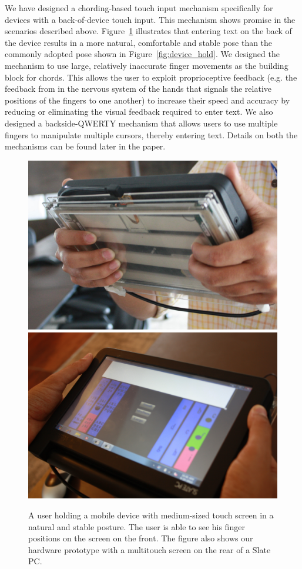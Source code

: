We have designed a chording-based touch input mechanism specifically for devices with a back-of-device touch input.  This mechanism shows promise in the scenarios described above.  Figure~\ref{fig:natural} illustrates that entering text on the back of the device results in a more natural, comfortable and stable pose than the commonly adopted pose shown in Figure~\ref{fig:device_hold}.  We designed the mechanism to use large, relatively inaccurate finger movements as the building
block for chords.  This allows the user to exploit proprioceptive feedback (e.g. the feedback from in the nervous system of the hands that signals the relative positions of the fingers to one another) to
increase their speed and accuracy by reducing or eliminating the visual feedback required to enter text. We also designed a backside-QWERTY mechanism that allows users to use multiple fingers to manipulate multiple cursors, thereby entering text. Details on both the mechanisms can be found later in the paper.

\begin{figure}
    \includegraphics[scale=0.43]{Figures/natural1.pdf} 
     \includegraphics[scale=0.43]{Figures/natural2.pdf} 
     \caption{A user holding a mobile device with medium-sized touch
       screen in a natural and stable posture. The user is able to see
       his finger positions on the screen on the front. The figure
       also shows our hardware prototype with a multitouch screen on
       the rear of a Slate PC.}
        \label{fig:natural}
\end{figure}

